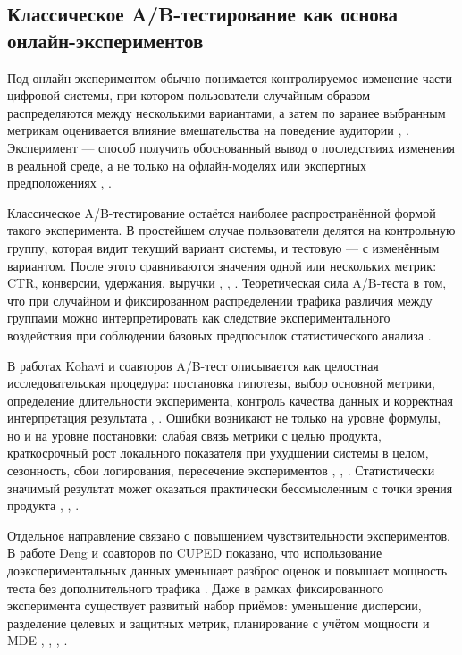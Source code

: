 \subsection{Классическое A/B-тестирование как основа онлайн-экспериментов}\label{ux43aux43bux430ux441ux441ux438ux447ux435ux441ux43aux43eux435-ab-ux442ux435ux441ux442ux438ux440ux43eux432ux430ux43dux438ux435-ux43aux430ux43a-ux43eux441ux43dux43eux432ux430-ux43eux43dux43bux430ux439ux43d-ux44dux43aux441ux43fux435ux440ux438ux43cux435ux43dux442ux43eux432}

Под онлайн-экспериментом обычно понимается контролируемое изменение части цифровой системы, при котором пользователи случайным образом распределяются между несколькими вариантами, а затем по заранее выбранным метрикам оценивается влияние вмешательства на поведение аудитории \cite{ref5}, \cite{ref10}. Эксперимент --- способ получить обоснованный вывод о последствиях изменения в реальной среде, а не только на офлайн-моделях или экспертных предположениях \cite{ref5}, \cite{ref20}.

Классическое A/B-тестирование остаётся наиболее распространённой формой такого эксперимента. В простейшем случае пользователи делятся на контрольную группу, которая видит текущий вариант системы, и тестовую --- с изменённым вариантом. После этого сравниваются значения одной или нескольких метрик: CTR, конверсии, удержания, выручки \cite{ref5}, \cite{ref10}, \cite{ref11}. Теоретическая сила A/B-теста в том, что при случайном и фиксированном распределении трафика различия между группами можно интерпретировать как следствие экспериментального воздействия при соблюдении базовых предпосылок статистического анализа \cite{ref5}.

В работах Kohavi и соавторов A/B-тест описывается как целостная исследовательская процедура: постановка гипотезы, выбор основной метрики, определение длительности эксперимента, контроль качества данных и корректная интерпретация результата \cite{ref5}, \cite{ref10}. Ошибки возникают не только на уровне формулы, но и на уровне постановки: слабая связь метрики с целью продукта, краткосрочный рост локального показателя при ухудшении системы в целом, сезонность, сбои логирования, пересечение экспериментов \cite{ref6}, \cite{ref10}, \cite{ref11}. Статистически значимый результат может оказаться практически бессмысленным с точки зрения продукта \cite{ref5}, \cite{ref10}, \cite{ref11}.

Отдельное направление связано с повышением чувствительности экспериментов. В работе Deng и соавторов по CUPED показано, что использование доэкспериментальных данных уменьшает разброс оценок и повышает мощность теста без дополнительного трафика \cite{ref7}. Даже в рамках фиксированного эксперимента существует развитый набор приёмов: уменьшение дисперсии, разделение целевых и защитных метрик, планирование с учётом мощности и MDE \cite{ref5}, \cite{ref7}, \cite{ref10}, \cite{ref20}.

